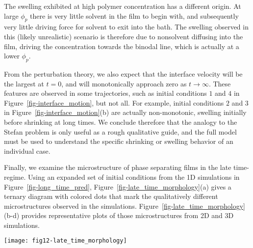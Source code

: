 \documentclass[journal=mamobx, layout=twocolumn]{achemso}
\begin{document}
The swelling exhibited at high polymer concentration has a different origin.
At large $\phi_{p}$ there is very little solvent in the film to begin with, and subsequently very little driving force for solvent to exit into the bath.
The swelling observed in this (likely unrealistic) scenario is therefore due to nonsolvent diffusing into the film, driving the concentration towards the binodal line, which is actually at a lower $\phi_{p}$.

From the perturbation theory, we also expect that the interface velocity will be the largest at $t=0$, and will monotonically approach zero as $t \rightarrow \infty$.
These features are observed in some trajectories, such as initial conditions $1$ and $4$ in Figure~\ref{fig-interface_motion}, but not all.
For example, initial conditions $2$ and $3$ in Figure~\ref{fig-interface_motion}(b) are actually non-monotonic, swelling initially before shrinking at long times.
We conclude therefore that the analogy to the Stefan problem is only useful as a rough qualitative guide, and the full model must be used to understand the specific shrinking or swelling behavior of an individual case.

Finally, we examine the microstructure of phase separating films in the late time-regime.
Using an expanded set of initial conditions from the 1D simulations in Figure~\ref{fig-long_time_pred}, Figure~\ref{fig-late_time_morphology}(a) gives a ternary diagram with colored dots that mark the qualitatively different microstructures observed in the simulations.
Figure~\ref{fig-late_time_morphology}(b-d) provides representative plots of those microstructures from 2D and 3D simulations. 

\begin{figure*}[tbp]
  \texttt{[image: fig12-late\_time\_morphology]}
  \caption{(a) Long-time simulations exhibiting late-time regime III colored by the observed microstructure in 2D simulations: 
non-solvent droplets in a polymer matrix (blue), alternating bands of polymer and nonsolvent (purple) and polymer droplets in nonsolvent (blue-green).
2D contour plots ($128 R_{0}\times 128 R_{0}$) and 3D density plots ($128 R_{0}\times 64 R_{0} \times 32 R_{0}$) of the polymer concentration showing microstructure: (b) nonsolvent droplets, (c) alternating bands and (d) polymer droplets.
The color bar on the right of (d) indicates polymer concentration and is valid for both 2D and 3D plots.
}
  \label{fig-late_time_morphology}
\end{figure*}
\end{document}
